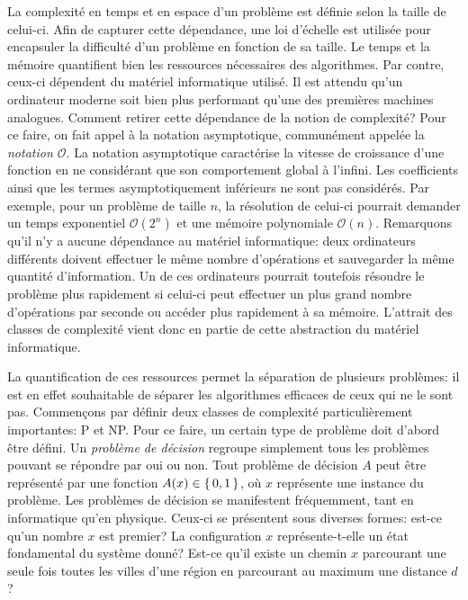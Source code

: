 La complexité en temps et en espace d'un problème est définie selon la taille de celui-ci. Afin de capturer cette dépendance, une loi d'échelle est utilisée pour encapsuler la difficulté d'un problème en fonction de sa taille. Le temps et la mémoire quantifient bien les ressources nécessaires des algorithmes. Par contre, ceux-ci dépendent du matériel informatique utilisé. Il est attendu qu'un ordinateur moderne soit bien plus performant qu'une des premières machines analogues. Comment retirer cette dépendance de la notion de complexité? Pour ce faire, on fait appel à la notation asymptotique, communément appelée la \textit{notation $\mathcal{O}$}. La notation asymptotique caractérise la vitesse de croissance d'une fonction en ne considérant que son comportement global à l'infini. Les coefficients ainsi que les termes asymptotiquement inférieurs ne sont pas considérés. Par exemple, pour un problème de taille $n$, la résolution de celui-ci pourrait demander un temps exponentiel $\mathcal{O}(2^{n})$ et une mémoire polynomiale $\mathcal{O}(n)$. Remarquons qu'il n'y a aucune dépendance au matériel informatique: deux ordinateurs différents doivent effectuer le même nombre d'opérations et sauvegarder la même quantité d'information. Un de ces ordinateurs pourrait toutefois résoudre le problème plus rapidement si celui-ci peut effectuer un plus grand nombre d'opérations par seconde ou accéder plus rapidement à sa mémoire. L'attrait des classes de complexité vient donc en partie de cette abstraction du matériel informatique.

La quantification de ces ressources permet la séparation de plusieurs problèmes: il est en effet souhaitable de séparer les algorithmes efficaces de ceux qui ne le sont pas. Commençons par définir deux classes de complexité particulièrement importantes: \textsf{P} et \textsf{NP}. Pour ce faire, un certain type de problème doit d'abord être défini. Un \textit{problème de décision} regroupe simplement tous les problèmes pouvant se répondre par oui ou non. Tout problème de décision $A$ peut être représenté par une fonction $A(x) \in \set{ 0, 1 }$, où $x$ représente une instance du problème. Les problèmes de décision se manifestent fréquemment, tant en informatique qu'en physique. Ceux-ci se présentent sous diverses formes: est-ce qu'un nombre $x$ est premier? La configuration $x$ représente-t-elle un état fondamental du système donné? Est-ce qu'il existe un chemin $x$ parcourant une seule fois toutes les villes d'une région en parcourant au maximum une distance $d$?

